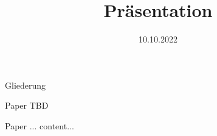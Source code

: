 \documentclass{beamer}
\title{Präsentation \teamname}
\author{\teamname}
\institute{Friedrich-Schiller-Universität Jena}
\date{10.10.2022}
\begin{document}
	
	\maketitle
	\begin{frame}{Gliederung}
		\tableofcontents
	\end{frame}
	
	\begin{section}{Paper TBD}
		\begin{frame}{Paper ...}
			content...
		\end{frame}
	\end{section}
	
	
	
%		
%		
	
\end{document}
